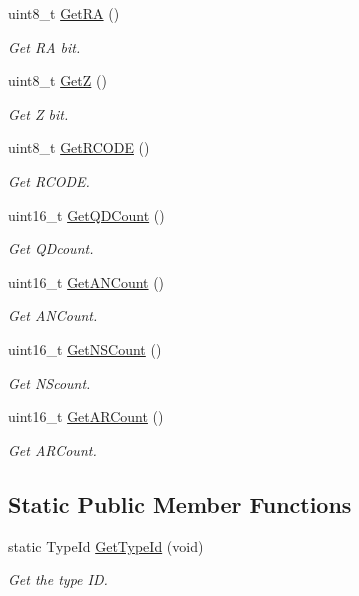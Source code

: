 \begin{DoxyCompactItemize}
uint8\-\_\-t \hyperlink{classns3_1_1DnsPlusHeader_a0d9c76d160543f5d6bcc032c6d1e8994}{Get\-R\-A} ()
\begin{DoxyCompactList}\small\item\em Get R\-A bit. \end{DoxyCompactList}\item 
uint8\-\_\-t \hyperlink{classns3_1_1DnsPlusHeader_af00e13f343d53b2bb84079b850e88eb5}{Get\-Z} ()
\begin{DoxyCompactList}\small\item\em Get Z bit. \end{DoxyCompactList}\item 
uint8\-\_\-t \hyperlink{classns3_1_1DnsPlusHeader_aa7f893eb6a224c347e11d5af5ec5e87c}{Get\-R\-C\-O\-D\-E} ()
\begin{DoxyCompactList}\small\item\em Get R\-C\-O\-D\-E. \end{DoxyCompactList}\item 
uint16\-\_\-t \hyperlink{classns3_1_1DnsPlusHeader_a72e660095dcbbcfbd3ea56af26081fde}{Get\-Q\-D\-Count} ()
\begin{DoxyCompactList}\small\item\em Get Q\-Dcount. \end{DoxyCompactList}\item 
uint16\-\_\-t \hyperlink{classns3_1_1DnsPlusHeader_ad4170edcd79f47db1d5d344265dbe814}{Get\-A\-N\-Count} ()
\begin{DoxyCompactList}\small\item\em Get A\-N\-Count. \end{DoxyCompactList}\item 
uint16\-\_\-t \hyperlink{classns3_1_1DnsPlusHeader_aabe109de0f4dd99b373f108b24a6f4dd}{Get\-N\-S\-Count} ()
\begin{DoxyCompactList}\small\item\em Get N\-Scount. \end{DoxyCompactList}\item 
uint16\-\_\-t \hyperlink{classns3_1_1DnsPlusHeader_a5a870a653b4cee6899e219510fbfa4a4}{Get\-A\-R\-Count} ()
\begin{DoxyCompactList}\small\item\em Get A\-R\-Count. \end{DoxyCompactList}\end{DoxyCompactItemize}
\subsection*{Static Public Member Functions}
\begin{DoxyCompactItemize}
\item 
static Type\-Id \hyperlink{classns3_1_1DnsPlusHeader_aca249927d0ab0ec498b4dd77c76fc9ec}{Get\-Type\-Id} (void)
\begin{DoxyCompactList}\small\item\em Get the type I\-D. \end{DoxyCompactList}\end{DoxyCompactItemize}
